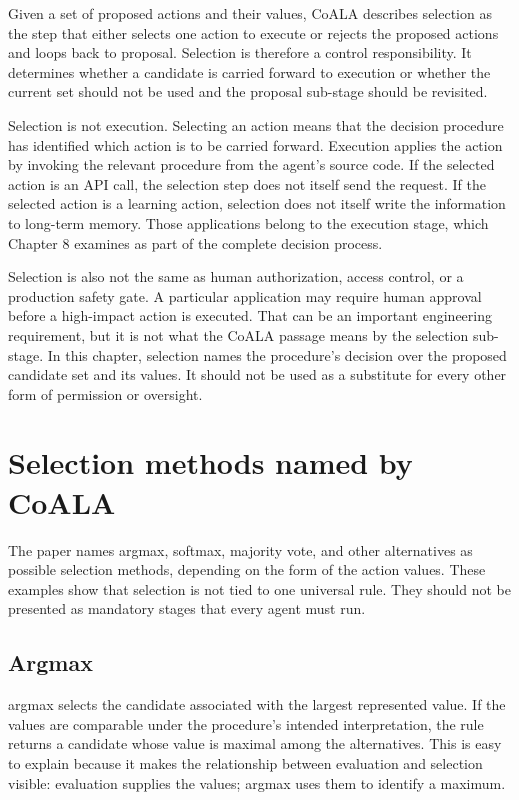 Given a set of proposed actions and their values, CoALA describes selection as the step that either selects one action to execute or rejects the proposed actions and loops back to proposal. Selection is therefore a control responsibility. It determines whether a candidate is carried forward to execution or whether the current set should not be used and the proposal sub-stage should be revisited.

Selection is not execution. Selecting an action means that the decision procedure has identified which action is to be carried forward. Execution applies the action by invoking the relevant procedure from the agent's source code. If the selected action is an API call, the selection step does not itself send the request. If the selected action is a learning action, selection does not itself write the information to long-term memory. Those applications belong to the execution stage, which Chapter 8 examines as part of the complete decision process.

Selection is also not the same as human authorization, access control, or a production safety gate. A particular application may require human approval before a high-impact action is executed. That can be an important engineering requirement, but it is not what the CoALA passage means by the selection sub-stage. In this chapter, selection names the procedure's decision over the proposed candidate set and its values. It should not be used as a substitute for every other form of permission or oversight.

\section{Selection methods named by CoALA}
\label{sec:selection-methods}

The paper names argmax, softmax, majority vote, and other alternatives as possible selection methods, depending on the form of the action values. These examples show that selection is not tied to one universal rule. They should not be presented as mandatory stages that every agent must run.

\subsection{Argmax}

\gls{argmax} selects the candidate associated with the largest represented value. If the values are comparable under the procedure's intended interpretation, the rule returns a candidate whose value is maximal among the alternatives. This is easy to explain because it makes the relationship between evaluation and selection visible: evaluation supplies the values; argmax uses them to identify a maximum.

